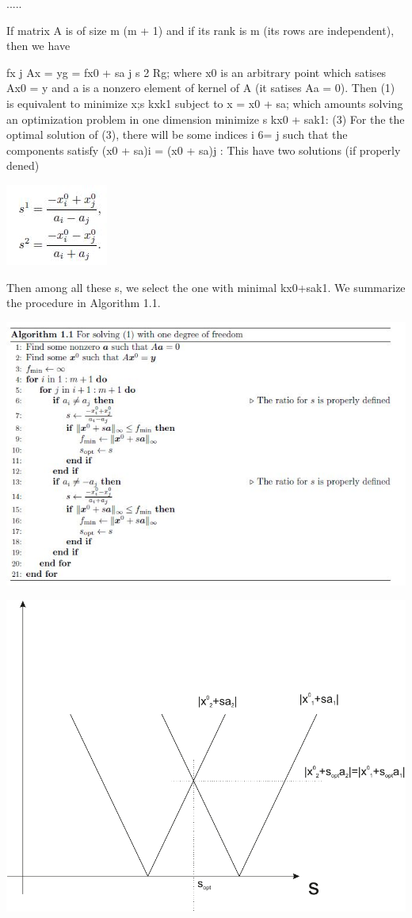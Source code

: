\documentclass[journal]{IEEEtranTIE}
\begin{document}
..... 

If matrix A is of size m (m + 1) and if its rank is m (its rows are
independent), then we have 

fx j Ax = yg = fx0 + sa j s 2 Rg; where x0 is an arbitrary point which
satises Ax0 = y and a is a nonzero element of kernel of A (it satises
Aa = 0). Then (1) is equivalent to minimize x;s kxk1 subject to x
= x0 + sa; which amounts solving an optimization problem in one dimension
minimize s kx0 + sak1: (3) For the the optimal solution of (3), there
will be some indices i 6= j such that the components satisfy (x0 +
sa)i = (x0 + sa)j : This have two solutions (if properly dened)

\includegraphics{Figures/temp3}

Then among all these s, we select the one with minimal kx0+sak1. We
summarize the procedure in Algorithm 1.1.

\includegraphics[width=0.9\columnwidth]{Figures/temp}

\includegraphics[width=0.9\columnwidth]{Figures/ilust_obr_x0+sa}
\end{document}
